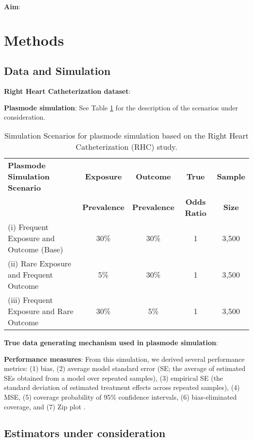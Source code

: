 \documentclass[sn-vancouver,Numbered,lineno,pdflatex]{sn-jnl}
\begin{document}
\textbf{Aim}:

\section{Methods}\label{methods}

\subsection*{Data and Simulation}\label{data-and-simulation}

\textbf{Right Heart Catheterization dataset}:

\textbf{Plasmode simulation}: See Table \ref{table:scenarios} for the
description of the scenarios under consideration.

\begin{table}[ht]
\centering
\caption{Simulation Scenarios for plasmode simulation based on the Right Heart Catheterization (RHC) study.}
\label{table:scenarios}
\begin{tabular}{lcccc}
  \toprule
  \textbf{Plasmode Simulation Scenario} & \textbf{Exposure} & \textbf{Outcome} & \textbf{True} & \textbf{Sample}\\
  \textbf{} & \textbf{Prevalence} & \textbf{Prevalence} & \textbf{Odds Ratio} & \textbf{Size}\\
  \midrule
  (i) Frequent Exposure and Outcome (Base) & 30\% & 30\% & 1 & 3,500 \\
  (ii) Rare Exposure and Frequent Outcome & 5\% & 30\% & 1 & 3,500 \\
  (iii) Frequent Exposure and Rare Outcome & 30\% & 5\% & 1 & 3,500 \\
  \bottomrule
\end{tabular}
\end{table}

\textbf{True data generating mechanism used in plasmode simulation}:

\textbf{Performance measures}: From this simulation, we derived several
performance metrics: (1) bias, (2) average model standard error (SE; the
average of estimated SEs obtained from a model over repeated samples),
(3) empirical SE (the standard deviation of estimated treatment effects
across repeated samples), (4) MSE, (5) coverage probability of 95\%
confidence intervals, (6) bias-eliminated coverage, and (7) Zip plot
\citep{morris2019using, white2023check}.

\subsection*{Estimators under
consideration}\label{estimators-under-consideration}
\end{document}
